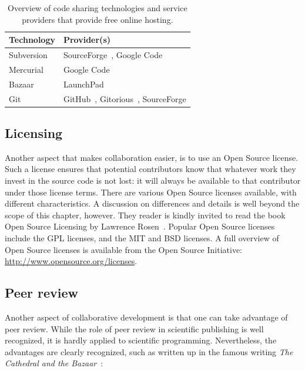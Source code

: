 \documentclass[12pt]{book}
\begin{document}
\begin{table}
\caption{Overview of code sharing technologies and service providers
that provide free online hosting.}
\label{tab:cvsProviders}
\begin{center}
\begin{tabularx}{0.7\textwidth}{ll}
\toprule
\textbf{Technology} & \textbf{Provider(s)} \\
\midrule 
 Subversion & SourceForge~\cite{url:sourceforge}, Google Code~\cite{url:googlecode} \\ 
 Mercurial & Google Code \\ 
 Bazaar & LaunchPad~\cite{url:launchpad} \\ 
 Git & GitHub~\cite{url:github}, Gitorious~\cite{url:gitorious}, SourceForge \\ 
\bottomrule
\end{tabularx}
\end{center}
\end{table}

\subsection{Licensing}

Another aspect that makes collaboration easier, is to use an
Open Source license. Such a license ensures that potential
contributors know that whatever work they invest in the source
code is not lost: it will always be available to that
contributor under those license terms.
There are various Open Source licenses available, with
different characteristics. A discussion on differences and
details is well beyond the scope of this chapter, however.
They reader is kindly invited to read the book
Open Source Licensing by Lawrence Rosen~\cite{Rosen2004}.
Popular Open Source licenses include the GPL
licenses, and the MIT and BSD licenses. A full overview of Open
Source licenses is available from the Open Source Initiative:
\url{http://www.opensource.org/licenses}.

\subsection{Peer review}

Another aspect of collaborative development is that one can
take advantage of peer review. While the role of peer review
in scientific publishing is well recognized, it is hardly
applied to scientific programming. Nevertheless, the
advantages are clearly recognized, such as written up
in the famous writing \textit{The Cathedral and the Bazaar}~\cite{Raymond2001}:
\end{document}
